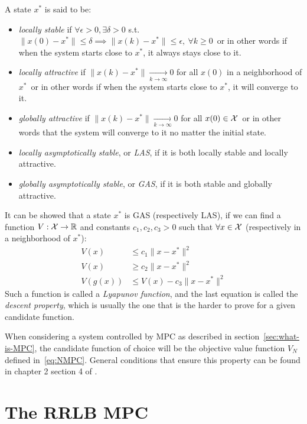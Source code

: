 \documentclass[12pt]{article}
\begin{document}
\noindent A state $x^*$ is said to be:
\begin{itemize}[label=\textbullet]
	\item \textit{locally stable} if $\forall\epsilon>0,\exists \delta>0$ s.t. $\|x(0)-x^*\|\leq\delta\implies\|x(k)-x^*\|\leq\epsilon,~\forall k\geq 0$\, or in other words if when the system starts close to $x^*$, it always stays close to it.
	\item \textit{locally attractive} if $\|x(k)-x^*\|\underset{k\to\infty}{\longrightarrow}0$ for all $x(0)$ in a neighborhood of $x^*$\, or in other words if when the system starts close to $x^*$, it will converge to it.
	\item \textit{globally attractive} if $\|x(k)-x^*\|\underset{k\to\infty}{\longrightarrow}0$ for all $x(0)\in\cal{X}$\, or in other words that the system will converge to it no matter the initial state.
	\item \textit{locally asymptotically stable}, or \textit{LAS}, if it is both locally stable and locally attractive.
	\item \textit{globally asymptotically stable}, or \textit{GAS}, if it is both stable and globally attractive.
\end{itemize}

It can be showed that a state $x^*$ is GAS (respectively LAS), if we can find a function $V:\cal{X}\to\R$ and constants $c_1,c_2,c_3>0$ such that $\forall x\in\cal{X}$ (respectively in a neighborhood of $x^*$):
\begin{align*}
	V(x)&\leq c_1\|x-x^*\|^2\\
	V(x)&\geq c_2\|x-x^*\|^2\\
	V(g(x))&\leq V(x)-c_3\|x-x^*\|^2
\end{align*}
Such a function is called a \textit{Lyapunov function}, and the last equation is called the \textit{descent property}, which is usually the one that is the harder to prove for a given candidate function.

\vspace{12pt}

When considering a system controlled by MPC as described in section~\ref{sec:what-is-MPC}, the candidate function of choice will be the objective value function $V_N$ defined in~\ref{eq:NMPC}.
General conditions that ensure this property can be found in chapter 2 section 4 of \cite{MPC-book}.



\section{The RRLB MPC}\label{sec:RRLB-MPC}
\end{document}
